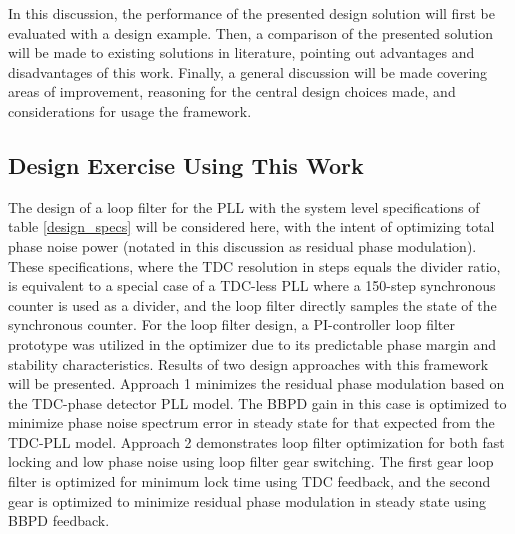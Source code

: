 In this discussion, the performance of the presented design solution will first be evaluated with a design example. Then, a comparison of the presented solution will be made to existing solutions in literature, pointing out advantages and disadvantages of this work. Finally, a general discussion will be made covering areas of improvement, reasoning for the central design choices made, and considerations for usage the framework.

\subsection{Design Exercise Using This Work}
The design of a loop filter for the PLL with the system level specifications of table \ref{design_specs} will be considered here, with the intent of optimizing total phase noise power (notated in this discussion as residual phase modulation). These specifications, where the TDC resolution in steps equals the divider ratio, is equivalent to a special case of a TDC-less PLL where a 150-step synchronous counter is used as a divider, and the loop filter directly samples the state of the synchronous counter. For the loop filter design, a PI-controller loop filter prototype was utilized in the optimizer due to its predictable phase margin and stability characteristics. Results of two design approaches with this framework will be presented. Approach 1 minimizes the residual phase modulation based on the TDC-phase detector PLL model. The BBPD gain in this case is optimized to minimize phase noise spectrum error in steady state for that expected from the TDC-PLL model. Approach 2 demonstrates loop filter optimization for both fast locking and low phase noise using loop filter gear switching. The first gear loop filter is optimized for minimum lock time using TDC feedback, and the second gear is optimized to minimize residual phase modulation in steady state using BBPD feedback.

